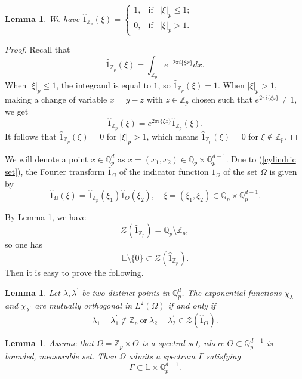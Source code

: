 \documentclass[a4paper,12pt]{amsart}
\newtheorem{lemma}[theorem]{Lemma}
\def\Z{\mathbb{Z}}
\def\Q{\mathbb{Q}}
\def\Zp{\mathbb{Z}_p}
\def\Qp{\mathbb{Q}_p}
\begin{document}
\begin{lemma}\label{ballspectrum}
We have $\widehat{1}_{\Zp}(\xi)=\left\{ \begin{array}{rcl}
1,& \mbox{if}& |\xi|_p\leq1; \\
0 ,& \mbox{if} & |\xi|_p>1.
\end{array}\right.$
 \end{lemma}


 \begin{proof} Recall that
 $$
    \widehat{1}_{\Zp}(\xi)
    = \int_{\Zp}e^{-2\pi i\{\xi x\}}dx.
 $$
 When $|\xi|_p\le 1$, the integrand is equal to $1$, so $\widehat{1}_{\Zp}(\xi)=1$.
 When $|\xi|_p>1$, making a change of variable $x = y-z$ with $z\in\Zp$ chosen
 such that $ e^{2\pi i\{\xi z\}}\not=1$,
 we get $$\widehat{1}_{\Zp}(\xi) = e^{2\pi i\{\xi z\}} \widehat{1}_{\Zp}(\xi).$$
 It follows that $\widehat{1}_{\Zp}(\xi)=0$ for $|\xi|_p>1$, which means
 $\widehat{1}_{\Zp}(\xi)=0$ for $\xi\notin\Zp$.
 \end{proof}

We will denote a point $x\in\Q_p^d$ as $x=(x_1, x_2)\in \Q_p\times\Q_p^{d-1}$.
Due to (\ref{cylindric set}), the Fourier transform $\widehat{1}_{\Omega}$ of the indicator
function $1_{\Omega}$ of the set
 $\Omega$ is given by
\begin{equation}
\widehat{1}_{\Omega}(\xi)=\widehat{1}_{\Z_p}(\xi_1)\widehat{1}_{\Theta}(\xi_2),
\quad \xi=(\xi_1, \xi_2)\in\Q_p\times\Q_p^{d-1} .
\end{equation}

By Lemma \ref{ballspectrum}, we have
$$\mathcal{Z}(\widehat{1}_{\Z_p})=\Qp\setminus \Zp,$$
so one has
$$\mathbb{L}\setminus\{0\}\subset\mathcal{Z}(\widehat{1}_{\Zp}).$$
Then it is easy to prove the following.

\begin{lemma}\label{lattice point}
 Let $\lambda,\lambda^{\prime}$ be two distinct points in $\Q_p^d$. The  exponential
 functions $\chi_{\lambda}$ and $\chi_{\lambda^{\prime}}$
 are mutually orthogonal in $L^2(\Omega)$ if and only if
 \[
 \lambda_1-\lambda^{\prime}_1\notin\Zp\ \text{or}\
\lambda_2-\lambda^{\prime}_2\in\mathcal{Z}(\widehat{1}_{\Theta}).
\]
\end{lemma}



\begin{lemma}\label{lemintegerspctrum}
 Assume that $\Omega= \Zp\times\Theta$ is a spectral set, where $\Theta\subset\Q_p^{d-1}$ is bounded, measurable set.
 Then $\Omega$ admits a spectrum $\Gamma$ satisfying
\begin{equation}\label{integer spectrum}
              \Gamma\subset\mathbb{L}\times\Q_p^{d-1}.
\end{equation}
\end{lemma}
\end{document}
